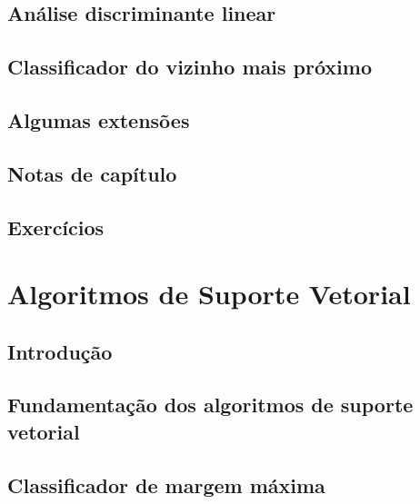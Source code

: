 \documentclass[
]{latex/krantz}
\theoremstyle{definition}
\theoremstyle{definition}
\theoremstyle{definition}
\theoremstyle{definition}
\theoremstyle{remark}
\begin{document}
\hypertarget{anuxe1lise-discriminante-linear}{%
\section{Análise discriminante linear}\label{anuxe1lise-discriminante-linear}}

\hypertarget{classificador-do-vizinho-mais-pruxf3ximo}{%
\section{Classificador do vizinho mais próximo}\label{classificador-do-vizinho-mais-pruxf3ximo}}

\hypertarget{algumas-extensuxf5es}{%
\section{Algumas extensões}\label{algumas-extensuxf5es}}

\hypertarget{notas-de-capuxedtulo-7}{%
\section{Notas de capítulo}\label{notas-de-capuxedtulo-7}}

\hypertarget{exercuxedcios-7}{%
\section{Exercícios}\label{exercuxedcios-7}}

\hypertarget{algoritmos-de-suporte-vetorial}{%
\chapter{Algoritmos de Suporte Vetorial}\label{algoritmos-de-suporte-vetorial}}

\hypertarget{introduuxe7uxe3o-8}{%
\section{Introdução}\label{introduuxe7uxe3o-8}}

\hypertarget{fundamentauxe7uxe3o-dos-algoritmos-de-suporte-vetorial}{%
\section{Fundamentação dos algoritmos de suporte vetorial}\label{fundamentauxe7uxe3o-dos-algoritmos-de-suporte-vetorial}}

\hypertarget{classificador-de-margem-muxe1xima}{%
\section{Classificador de margem máxima}\label{classificador-de-margem-muxe1xima}}
\end{document}
